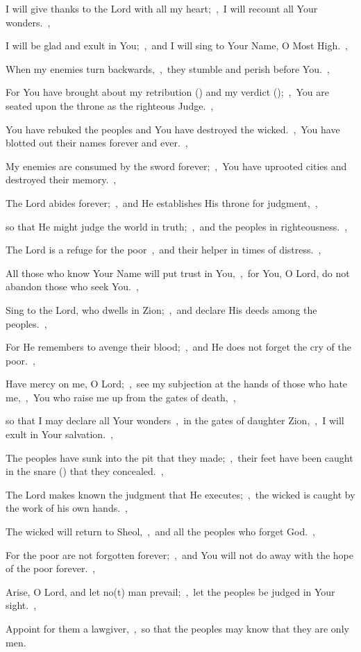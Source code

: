 \documentclass[12pt,twoside,a5paper]{article}
\begin{document}
\begin{normalparskip}
  I will give thanks to the Lord with all my heart;~\sep\ I will recount all Your wonders.~\sep


  I will be glad and exult in You;~\sep\ and I will sing to Your Name, O Most High.~\sep

  When my enemies turn backwards,~\sep\ they stumble and perish before You.~\sep

  For You have brought about my retribution () and my verdict ();~\sep\ You are seated upon the throne as the righteous Judge.~\sep

  You have rebuked the peoples and You have destroyed the wicked.~\sep\ You have blotted out their names forever and ever.~\sep

  My enemies are consumed by the sword forever;~\sep\ You have uprooted cities and destroyed their memory.~\sep

  The Lord abides forever;~\sep\ and He establishes His throne for judgment,~\sep

  so that He might judge the world in truth;~\sep\ and the peoples in righteousness.~\sep

  The Lord is a refuge for the poor~\sep\ and their helper in times of distress.~\sep

  All those who know Your Name will put trust in You,~\sep\ for You, O Lord, do not abandon those who seek You.~\sep

  Sing to the Lord, who dwells in Zion;~\sep\ and declare His deeds among the peoples.~\sep

  For He remembers to avenge their blood;~\sep\ and He does not forget the cry of the poor.~\sep

  Have mercy on me, O Lord;~\sep\ see my subjection at the hands of those who hate me,~\sep\ You who raise me up from the gates of death,~\sep

  so that I may declare all Your wonders~\sep\ in the gates of daughter Zion,~\sep\ I will exult in Your salvation.~\sep

  The peoples have sunk into the pit that they made;~\sep\ their feet have been caught in the snare () that they concealed.~\sep

  The Lord makes known the judgment that He executes;~\sep\ the wicked is caught by the work of his own hands.~\sep

  The wicked will return to Sheol,~\sep\ and all the peoples who forget God.~\sep

  For the poor are not forgotten forever;~\sep\ and You will not do away with the hope of the poor forever.~\sep

  Arise, O Lord, and let no(t) man prevail;~\sep\ let the peoples be judged in Your sight.~\sep

  Appoint for them a lawgiver,~\sep\ so that the peoples may know that they are only men.
\end{normalparskip}
\end{document}
